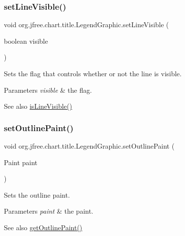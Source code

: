 \subsubsection{\texorpdfstring{set\+Line\+Visible()}{setLineVisible()}}
{\footnotesize\ttfamily void org.\+jfree.\+chart.\+title.\+Legend\+Graphic.\+set\+Line\+Visible (\begin{DoxyParamCaption}\item[{boolean}]{visible }\end{DoxyParamCaption})}

Sets the flag that controls whether or not the line is visible.


\begin{DoxyParams}{Parameters}
{\em visible} & the flag.\\
\hline
\end{DoxyParams}
\begin{DoxySeeAlso}{See also}
\mbox{\hyperlink{classorg_1_1jfree_1_1chart_1_1title_1_1_legend_graphic_ad674b4beaa7cabe7f5b50e7c47a3e87d}{is\+Line\+Visible()}} 
\end{DoxySeeAlso}
\mbox{\label{classorg_1_1jfree_1_1chart_1_1title_1_1_legend_graphic_afc046475b36b33eb947fccd915b1a44f}} 
\subsubsection{\texorpdfstring{set\+Outline\+Paint()}{setOutlinePaint()}}
{\footnotesize\ttfamily void org.\+jfree.\+chart.\+title.\+Legend\+Graphic.\+set\+Outline\+Paint (\begin{DoxyParamCaption}\item[{Paint}]{paint }\end{DoxyParamCaption})}

Sets the outline paint.


\begin{DoxyParams}{Parameters}
{\em paint} & the paint.\\
\hline
\end{DoxyParams}
\begin{DoxySeeAlso}{See also}
\mbox{\hyperlink{classorg_1_1jfree_1_1chart_1_1title_1_1_legend_graphic_a0e3663eec1cd7ca9ab1af059cfd8e59a}{get\+Outline\+Paint()}} 
\end{DoxySeeAlso}
\mbox{\label{classorg_1_1jfree_1_1chart_1_1title_1_1_legend_graphic_a64e612da91f167c9bff186af2c4eed94}} 
